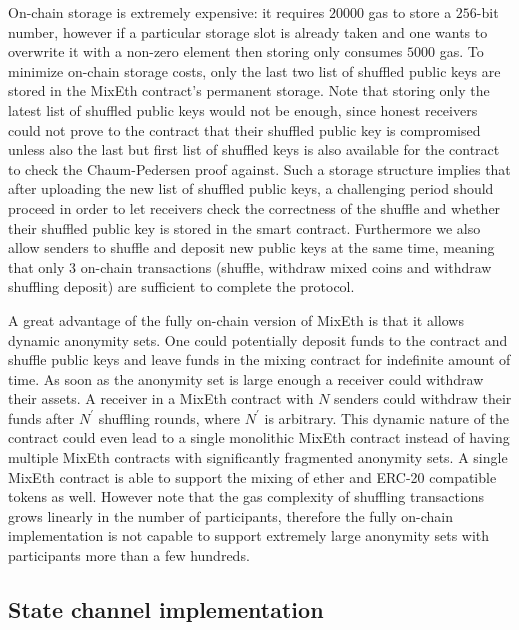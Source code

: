 \documentclass[a4paper,UKenglish,cleveref, autoref]{oasics-v2019}
\begin{document}
On-chain storage is extremely expensive: it requires $\num[group-separator={,}]{20000}$ gas to store a $256$-bit number, however if a particular storage slot is already taken and one wants to overwrite it with a non-zero element then storing only consumes $\num[group-separator={,}]{5000}$ gas. To minimize on-chain storage costs, only the last two list of shuffled public keys are stored in the MixEth contract's permanent storage. Note that storing only the latest list of shuffled public keys would not be enough, since honest receivers could not prove to the contract that their shuffled public key is compromised unless also the last but first list of shuffled keys is also available for the contract to check the Chaum-Pedersen proof against. Such a storage structure implies that after uploading the new list of shuffled public keys, a challenging period should proceed in order to let receivers check the correctness of the shuffle and whether their shuffled public key is stored in the smart contract. Furthermore we also allow senders to shuffle and deposit new public keys at the same time, meaning that only $3$ on-chain transactions (shuffle, withdraw mixed coins and withdraw shuffling deposit) are sufficient to complete the protocol.

A great advantage of the fully on-chain version of MixEth is that it allows dynamic anonymity sets. One could potentially deposit funds to the contract and shuffle public keys and leave funds in the mixing contract for indefinite amount of time. As soon as the anonymity set is large enough a receiver could withdraw their assets. A receiver in a MixEth contract with $N$ senders could withdraw their funds after $N^{'}$ shuffling rounds, where $N^{'}$ is arbitrary.  This dynamic nature of the contract could even lead to a single monolithic MixEth contract instead of having multiple MixEth contracts with significantly fragmented anonymity sets. A single MixEth contract is able to support the mixing of ether and ERC-20 compatible tokens as well. However note that the gas complexity of shuffling transactions grows linearly in the number of participants, therefore the fully on-chain implementation is not capable to support extremely large anonymity sets with participants more than a few hundreds. 
        
\subsection{State channel implementation} \label{statechannelimpl}
\end{document}
